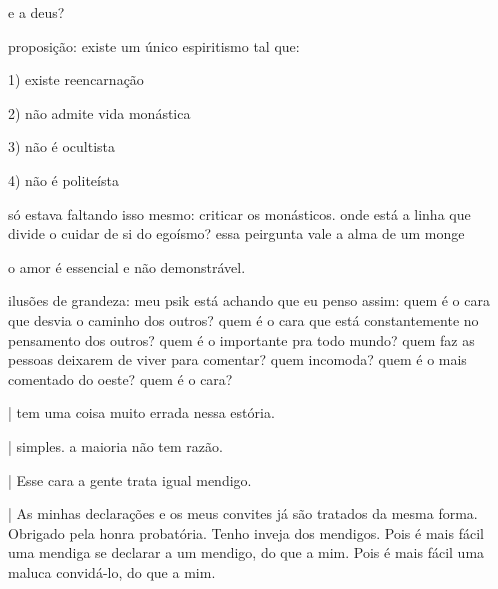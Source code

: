 \documentclass[12pt,a4paper]{article}
\begin{document}
e a deus?

			\begin{flushright}
			\end{flushright}

proposi\c{c}\~ao: existe um \'unico espiritismo tal que:

1) existe reencarna\c{c}\~ao

2) n\~ao admite vida mon\'astica

3) n\~ao \'e ocultista

4) n\~ao \'e polite\'ista

s\'o estava faltando isso mesmo: criticar os mon\'asticos. onde est\'a a linha que divide o cuidar de si do ego\'ismo? essa peirgunta vale a alma de um monge

			\begin{flushright}
			\end{flushright}

o amor \'e essencial e n\~ao demonstr\'avel.

			\begin{flushright}
			\end{flushright}

ilus\~oes de grandeza: meu psik est\'a achando que eu penso assim: quem \'e o cara que desvia o caminho dos outros? quem \'e o cara que est\'a constantemente no pensamento dos outros? quem \'e o importante pra todo mundo? quem faz as pessoas deixarem de viver para comentar? quem incomoda? quem \'e o mais comentado do oeste? quem \'e o cara?

			\begin{flushright}
			\end{flushright}

		| tem uma coisa muito errada nessa est\'oria.

		| simples. a maioria n\~ao tem raz\~ao.

			\begin{flushright}
			\end{flushright}

| Esse cara a gente trata igual mendigo.

| As minhas declara\c{c}\~oes e os meus convites j\'a s\~ao tratados da mesma
forma. Obrigado pela honra probat\'oria. Tenho inveja dos mendigos. Pois \'e
 mais f\'acil uma mendiga se declarar a um mendigo, do que a mim. Pois \'e
mais f\'acil uma maluca convid\'a-lo, do que a mim.

			\begin{flushright}
			\end{flushright}
\end{document}

